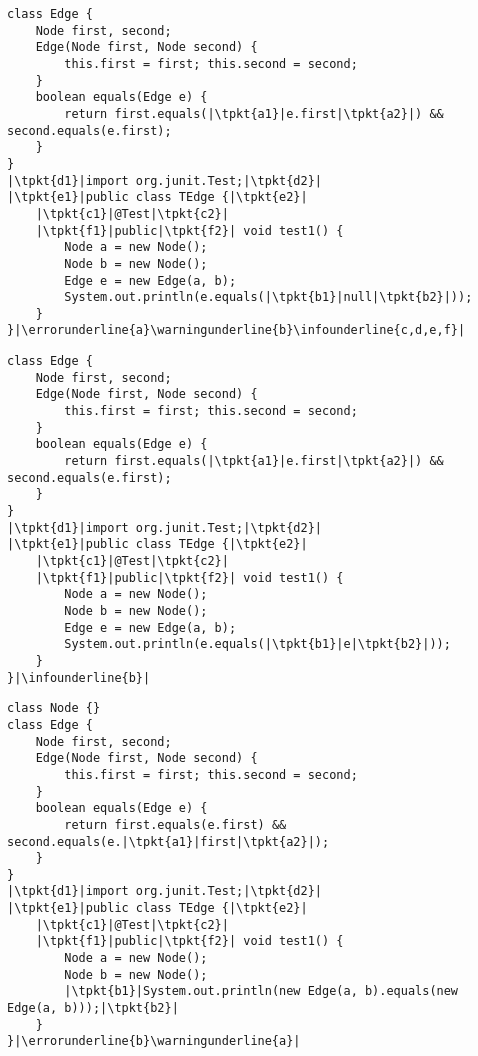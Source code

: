 \newsavebox{\bugtwoagain}
\begin{lrbox}{\bugtwoagain}
\begin{lstlisting}
class Edge {
	Node first, second;
	Edge(Node first, Node second) {
		this.first = first; this.second = second;
	}
	boolean equals(Edge e) {
		return first.equals(|\tpkt{a1}|e.first|\tpkt{a2}|) && second.equals(e.first);
	}
}
|\tpkt{d1}|import org.junit.Test;|\tpkt{d2}|
|\tpkt{e1}|public class TEdge {|\tpkt{e2}|
	|\tpkt{c1}|@Test|\tpkt{c2}|
	|\tpkt{f1}|public|\tpkt{f2}| void test1() {
		Node a = new Node();
		Node b = new Node();
		Edge e = new Edge(a, b);
		System.out.println(e.equals(|\tpkt{b1}|null|\tpkt{b2}|));
	}
}|\errorunderline{a}\warningunderline{b}\infounderline{c,d,e,f}|
\end{lstlisting}
\end{lrbox}

\newsavebox{\codethree}
\begin{lrbox}{\codethree}
\begin{lstlisting}
class Edge {
	Node first, second;
	Edge(Node first, Node second) {
		this.first = first; this.second = second;
	}
	boolean equals(Edge e) {
		return first.equals(|\tpkt{a1}|e.first|\tpkt{a2}|) && second.equals(e.first);
	}
}
|\tpkt{d1}|import org.junit.Test;|\tpkt{d2}|
|\tpkt{e1}|public class TEdge {|\tpkt{e2}|
	|\tpkt{c1}|@Test|\tpkt{c2}|
	|\tpkt{f1}|public|\tpkt{f2}| void test1() {
		Node a = new Node();
		Node b = new Node();
		Edge e = new Edge(a, b);
		System.out.println(e.equals(|\tpkt{b1}|e|\tpkt{b2}|));
	}
}|\infounderline{b}|
\end{lstlisting}
\end{lrbox}

\newsavebox{\bugthree}
\begin{lrbox}{\bugthree}
\begin{lstlisting}
class Node {}
class Edge {
	Node first, second;
	Edge(Node first, Node second) {
		this.first = first; this.second = second;
	}
	boolean equals(Edge e) {
		return first.equals(e.first) && second.equals(e.|\tpkt{a1}|first|\tpkt{a2}|);
	}
}
|\tpkt{d1}|import org.junit.Test;|\tpkt{d2}|
|\tpkt{e1}|public class TEdge {|\tpkt{e2}|
	|\tpkt{c1}|@Test|\tpkt{c2}|
	|\tpkt{f1}|public|\tpkt{f2}| void test1() {
		Node a = new Node();
		Node b = new Node();
		|\tpkt{b1}|System.out.println(new Edge(a, b).equals(new Edge(a, b)));|\tpkt{b2}|
	}
}|\errorunderline{b}\warningunderline{a}|
\end{lstlisting}
\end{lrbox}

